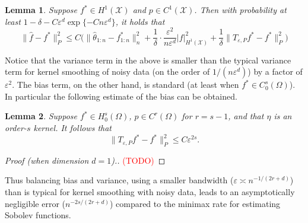 \documentclass{article}
\newcommand{\1}{\mathbf{1}}
\newcommand{\mc}[1]{\mathcal{#1}}
\newcommand{\wh}[1]{\widehat{#1}}
\newtheorem{lemma}{Lemma}
\theoremstyle{definition}
\theoremstyle{remark}
\begin{document}
\begin{lemma}
	\label{lem:kernel_smoothing_laplacian_eigenmaps}
	Suppose $f^{\ast} \in H^1(\mc{X})$ and $p \in C^1(\mc{X})$. Then with probability at least $1 - \delta - C\varepsilon^d\exp\{-Cn\varepsilon^d\}$, it holds that
	\begin{equation*}
	\|\wh{f} - f^{\ast}\|_P^2 \leq C\biggl(\|\wh{\theta}_{1:n} - f^{\ast}_{1:n}\|_n^2 + \frac{1}{\delta} \cdot \frac{\varepsilon^2}{n\varepsilon^d} |f|_{H^1(\mc{X})}^2 + \frac{1}{\delta}\|T_{\varepsilon,P}f^{\ast} - f^{\ast}\|_P^2\biggr)
	\end{equation*}
\end{lemma}
Notice that the variance term in the above is smaller than the typical variance term for kernel smoothing of noisy data (on the order of $1/(n\varepsilon^d)$) by a factor of $\varepsilon^2$. The bias term, on the other hand, is standard (at least when $f^{\ast} \in C_0^s(\Omega)$). In particular the following estimate of the bias can be obtained. 
\begin{lemma}
	\label{lem:kernel_smoothing_bias}
	Suppose $f^{\ast} \in H_0^{s}(\Omega)$, $p \in C^{r}(\Omega)$ for $r = s - 1$, and that $\eta$ is an order-$s$ kernel. It follows that
	\begin{equation*}
	\|T_{\varepsilon,P}f^{\ast} - f^{\ast}\|_P^2 \leq C \varepsilon^{2s}.
	\end{equation*}
\end{lemma}
\begin{proof}[Proof (when dimension $d = 1$).]
	\textcolor{red}{(TODO)}
\end{proof}

Thus balancing bias and variance, using a smaller bandwidth ($\varepsilon \asymp n^{-1/(2r + d)}$) than is typical for kernel smoothing with noisy data, leads to an asymptotically negligible error ($n^{-2s/(2r + d)}$) compared to the minimax rate for estimating Sobolev functions. 
\end{document}
